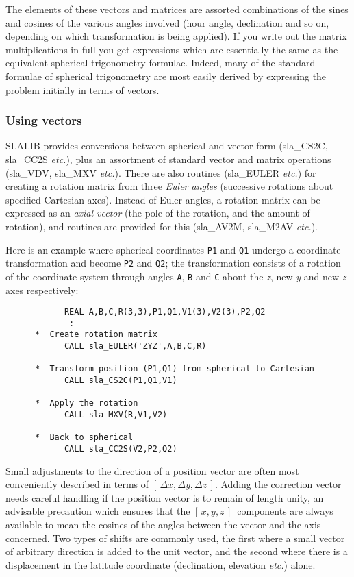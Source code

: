 \documentclass[11pt,twoside]{article}
\newcommand{\xyz}       {$[\,x,y,z\,]$}
\begin{document}
The elements of these vectors and matrices are assorted combinations of
the sines and cosines of the various angles involved (hour angle,
declination and so on, depending on which transformation is
being applied).  If you write out the matrix multiplications
in full you get expressions which are essentially the same as the
equivalent spherical trigonometry formulae.  Indeed, many of the
standard formulae of spherical trigonometry are most easily
derived by expressing the problem initially in
terms of vectors.

\subsubsection{Using vectors}
SLALIB provides conversions between spherical and vector
form
(sla\_CS2C,
sla\_CC2S
{\it etc.}), plus an assortment
of standard vector and matrix operations
(sla\_VDV,
sla\_MXV
{\it etc.}).
There are also routines
(sla\_EULER
{\it etc.}) for creating a rotation matrix
from three {\it Euler angles}\/ (successive rotations about
specified Cartesian axes).  Instead of Euler angles, a rotation
matrix can be expressed as an {\it axial vector}\/ (the pole of the rotation,
and the amount of rotation), and routines are provided for this
(sla\_AV2M,
sla\_M2AV
{\it etc.}).

Here is an example where spherical coordinates {\tt P1} and {\tt Q1}
undergo a coordinate transformation and become {\tt P2} and {\tt Q2};
the transformation consists of a rotation of the coordinate system
through angles {\tt A}, {\tt B} and {\tt C} about the
{\it z}, new {\it y}\/ and new {\it z}\/ axes respectively:
\goodbreak
\begin{verbatim}
            REAL A,B,C,R(3,3),P1,Q1,V1(3),V2(3),P2,Q2
             :
      *  Create rotation matrix
            CALL sla_EULER('ZYZ',A,B,C,R)

      *  Transform position (P1,Q1) from spherical to Cartesian
            CALL sla_CS2C(P1,Q1,V1)

      *  Apply the rotation
            CALL sla_MXV(R,V1,V2)

      *  Back to spherical
            CALL sla_CC2S(V2,P2,Q2)
\end{verbatim}
\goodbreak
Small adjustments to the direction of a position
vector are often most conveniently described in terms of
$[\,\Delta x,\Delta y, \Delta z\,]$.  Adding the correction
vector needs careful handling if the position
vector is to remain of length unity, an advisable precaution which
ensures that
the \xyz\ components are always available to mean the cosines of
the angles between the vector and the axis concerned.  Two types
of shifts are commonly used,
the first where a small vector of arbitrary direction is
added to the unit vector, and the second where there is a displacement
in the latitude coordinate (declination, elevation {\it etc.}) alone.
\end{document}
